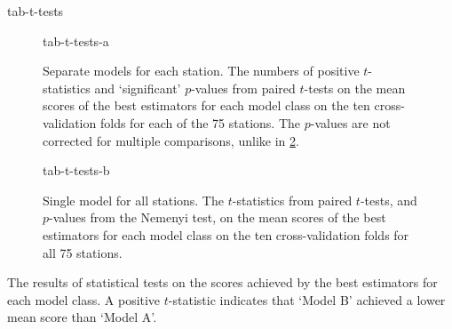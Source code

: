 {tab-t-tests}

\begin{table}
  \centering
  \begin{subfigure}{\textwidth}
    \centering
    {tab-t-tests-a}
    \caption{Separate models for each station.
      The numbers of positive $t$-statistics and `significant' $p$-values from paired
      $t$-tests on the mean scores of the best estimators for each model class on the ten
      cross-validation folds for each of the 75 stations.
      The $p$-values are not corrected for multiple comparisons, unlike in
      \cref{sub-task-1:tab-t-tests-b}.
    }
    \label{sub-task-1:tab-t-tests-a}
  \end{subfigure}
  \subfigurespace
  \begin{subfigure}{\textwidth}
    \centering
    {tab-t-tests-b}
    \caption{Single model for all stations.
      The $t$-statistics from paired $t$-tests, and $p$-values from the Nemenyi test, on the
      mean scores of the best estimators for each model class on the ten cross-validation
      folds for all 75 stations.
    }
    \label{sub-task-1:tab-t-tests-b}
  \end{subfigure}
  \caption{The results of statistical tests on the scores achieved by the best
    estimators for each model class.
    A positive $t$-statistic indicates that `Model B' achieved a lower mean score than
    `Model A'.
  }
  \label{sub-task-1:tab-t-tests}
\end{table}
